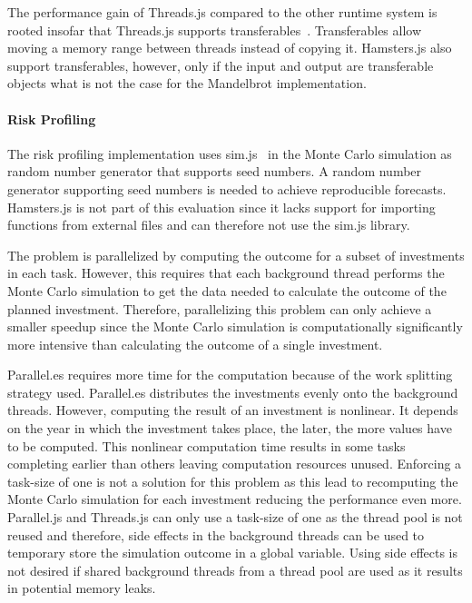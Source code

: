 The performance gain of Threads.js compared to the other runtime system is rooted insofar that Threads.js supports transferables~\cite[Section 2.7.4]{w3cHtml5}. Transferables allow moving a memory range between threads instead of copying it. Hamsters.js also support transferables, however, only if the input and output are transferable objects what is not the case for the Mandelbrot implementation.

\paragraph{Risk Profiling}
The risk profiling implementation uses sim.js~\cite{simjs} in the Monte Carlo simulation as random number generator that supports seed numbers. A random number generator supporting seed numbers is needed to achieve reproducible forecasts. Hamsters.js is not part of this evaluation since it lacks support for importing functions from external files and can therefore not use the sim.js library. 

The problem is parallelized by computing the outcome for a subset of investments in each task. However, this requires that each background thread performs the Monte Carlo simulation to get the data needed to calculate the outcome of the planned investment. Therefore, parallelizing this problem can only achieve a smaller speedup since the Monte Carlo simulation is computationally significantly more intensive than calculating the outcome of a single investment.

Parallel.es requires more time for the computation because of the work splitting strategy used. Parallel.es distributes the investments evenly onto the background threads. However, computing the result of an investment is nonlinear. It depends on the year in which the investment takes place, the later, the more values have to be computed. This nonlinear computation time results in some tasks completing earlier than others leaving computation resources unused. Enforcing a task-size of one is not a solution for this problem as this lead to recomputing the Monte Carlo simulation for each investment reducing the performance even more. Parallel.js and Threads.js can only use a task-size of one as the thread pool is not reused and therefore, side effects in the background threads can be used to temporary store the simulation outcome in a global variable. Using side effects is not desired if shared background threads from a thread pool are used as it results in potential memory leaks.

